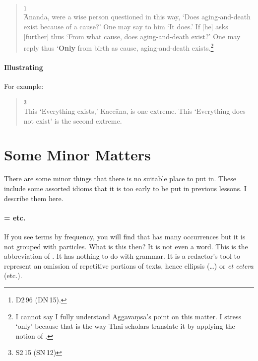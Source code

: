 \begin{quote}
\footnote{D2\,96 (DN\,15).}\\
\=Ananda, were a wise person questioned in this way, `Does aging-and-death exist because of a cause?' One may say to him `It does.' If [he] asks [further] thus `From what cause, does aging-and-death exist?' One may reply thus `\textbf{Only} from birth as cause, aging-and-death exists.\footnote{I cannot say I fully understand Aggava\d msa's point on this matter. I stress `only' because that is the way Thai scholars translate it by applying the notion of .}\\
\end{quote}

\paragraph*{Illustrating} For example:

\begin{quote}
\footnote{S2\,15 (SN\,12)}\\
This `Everything exists,' Kacc\=ana, is one extreme. This `Everything does not exist' is the second extreme.
\end{quote}

{}
\section*{Some Minor Matters}

There are some minor things that there is no suitable place to put in. These include some assorted idioms that it is too early to be put in previous lessons. I describe them here.

\paragraph*{ = etc.} If you see terms by frequency, you will find that  has many occurrences but it is not grouped with particles. What is this then? It is not even a word. This is the abbreviation of . It has nothing to do with grammar. It is a redactor's tool to represent an omission of repetitive portions of texts, hence ellipsis (\dots) or \textit{et cetera} (etc.).

